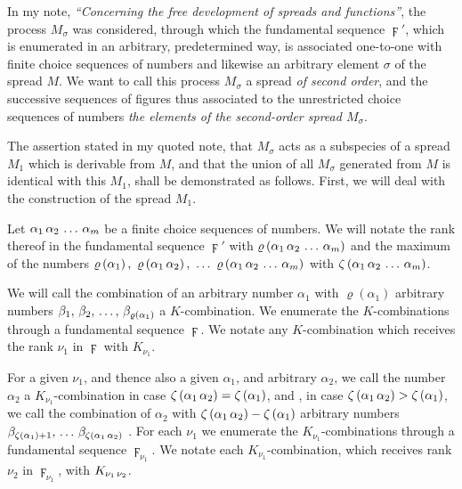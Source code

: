 \documentclass{amsart}
\newcommand\Rank[1]{\varrho\left(#1\right)}
\newcommand\Max[1]{\zeta\left(#1\right)}
\begin{document}


In my note, \emph{``Concerning the free development of spreads and
functions''}, the process $M_\sigma$ was considered, through which
the fundamental sequence $\digamma'$, which is enumerated in an arbitrary,
predetermined way, is associated one-to-one with finite choice sequences of
numbers and likewise an arbitrary element $\sigma$ of the spread $M$. We want to call this process $M_\sigma$ a
spread \emph{of second order}, and the successive sequences of figures thus
associated to the unrestricted choice sequences of numbers  \emph{the elements of the second-order spread $M_\sigma$}.

The assertion stated in my quoted note, that $M_\sigma$ acts as a subspecies of
a spread $M_1$ which is derivable from $M$, and that the union of all
$M_\sigma$ generated from $M$ is identical with this $M_1$, shall be
demonstrated as follows. First, we will deal with the construction of the
spread $M_1$.

Let $\Sequence{\alpha_1, \alpha_2, \dots, \alpha_m}$ be a finite choice
sequences of numbers. We will notate the rank thereof in the fundamental
sequence $\digamma'$ with $\Rank{\Sequence{\alpha_1,\alpha_2,\dots,\alpha_m}}$
and the maximum of the numbers $\Rank{\alpha_1},\
\Rank{\Sequence{\alpha_1,\alpha_2}},\ \dots\
\Rank{\Sequence{\alpha_1,\alpha_2,\dots,\alpha_m}}$ with
$\Max{\Sequence{\alpha_1,\alpha_2,\dots,\alpha_m}}$.

We will call the combination of an arbitrary number $\alpha_1$ with
$\Rank{\alpha_1}$ arbitrary numbers
$\Sequence[,\,]{\beta_1,\beta_2,\dots,\beta_{\Rank{\alpha_1}}}$ a $K$-combination. We
enumerate the $K$-combinations through a fundamental sequence $\digamma$. We
notate any $K$-combination which receives the rank $\nu_1$ in $\digamma$ with
$K_{\nu_1}$.

For a given $\nu_1$, and thence also a given $\alpha_1$, and arbitrary
$\alpha_2$, we call the number $\alpha_2$ a $K_{\nu_1}$-combination in case
$\Max{\Sequence{\alpha_1,\alpha_2}} = \Max{\alpha_1}$, and ,
in case $\Max{\Sequence{\alpha_1,\alpha_2}} > \Max{\alpha_1}$, we call the
combination of $\alpha_2$ with $\Max{\Sequence{\alpha_1,\alpha_2}} -
\Max{\alpha_1}$ arbitrary numbers
$\beta_{\Max{\alpha_1}+1},\,\dots\,\beta_{\Max{\Sequence{\alpha_1,\alpha_2}}}$
\EdMark{a $K_{\nu_1}$-combination}. For each $\nu_1$ we enumerate the
$K_{\nu_1}$-combinations through a fundamental sequence $\digamma_{\nu_1}$. We
notate each $K_{\nu_1}$-combination, which receives rank $\nu_2$ in
$\digamma_{\nu_1}$, with $K_{\Sequence{\nu_1,\nu_2}}$.
\end{document}
